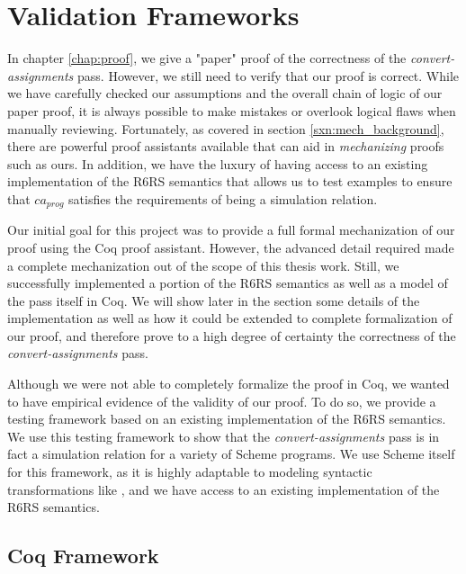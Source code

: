 \chapter{Validation Frameworks\label{chap:valid}}
In chapter \ref{chap:proof}, we give a "paper" proof of the correctness of the \textit{convert-assignments} pass. However, we still need to verify that our proof is correct. While we have carefully checked our assumptions and the overall chain of logic of our paper proof, it is always possible to make mistakes or overlook logical flaws when manually reviewing. Fortunately, as covered in section \ref{sxn:mech_background}, there are powerful proof assistants available that can aid in \textit{mechanizing} proofs such as ours. In addition, we have the luxury of having access to an existing implementation of the R6RS semantics that allows us to test examples to ensure that $ca_{prog}$ satisfies the requirements of being a simulation relation.

Our initial goal for this project was to provide a full formal mechanization of our proof using the Coq proof assistant. However, the advanced detail required made a complete mechanization out of the scope of this thesis work. Still, we successfully implemented a portion of the R6RS semantics as well as a model of the pass itself in Coq. We will show later in the section some details of the implementation as well as how it could be extended to complete formalization of our proof, and therefore prove to a high degree of certainty the correctness of the \textit{convert-assignments} pass.

Although we were not able to completely formalize the proof in Coq, we wanted to have empirical evidence of the validity of our proof. To do so, we provide a testing framework based on an existing implementation of the R6RS semantics. We use this testing framework to show that the \textit{convert-assignments} pass is in fact a simulation relation for a variety of Scheme programs. We use Scheme itself for this framework, as it is highly adaptable to modeling syntactic transformations like \caname, and we have access to an existing implementation of the R6RS semantics.

\section{Coq Framework}\label{sxn:coq_overview}
